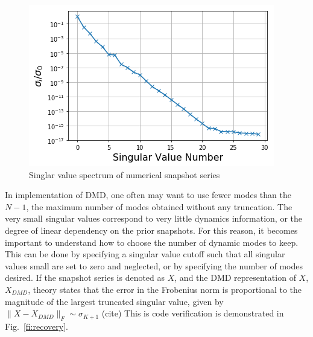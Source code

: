 \documentclass[12pt]{article}
\newcommand{\LFI}[1]{\label{fi:#1}}
\newcommand{\FI}[1]{Fig.~\ref{fi:#1}}
\newcommand{\bfg}{\begin{figure}}
\newcommand{\efg}{\end{figure}}
\begin{document}
\bfg[h] \centering
	\includegraphics[scale=0.5]{singularValueSpectrum_flux.png}
	\caption{Singlar value spectrum of numerical snapshot series}
	\LFI{sv-spec}
\efg

In implementation of DMD, one often may want to use fewer modes than the $N-1$, the maximum 
	number of modes obtained without any truncation. 
The very small singular values correspond to very little dynamics information, or the degree of linear 
	dependency on the prior snapshots.
For this reason, it becomes important to understand how to choose the number of dynamic modes to keep.
This can be done by specifying a singular value cutoff such that all singular values small are set to zero 
	and neglected, or by specifying the number of modes desired.
If the snapshot series is denoted as $X$, and the DMD representation of $X$, $X_{DMD}$, theory 
	states that the error in the Frobenius norm is proportional to the magnitude of the largest truncated
	singular value, given by $\lVert X - X_{DMD} \rVert_F \sim \sigma_{K+1}$ (cite)
This is code verification is demonstrated in \FI{recovery}.
\end{document}
